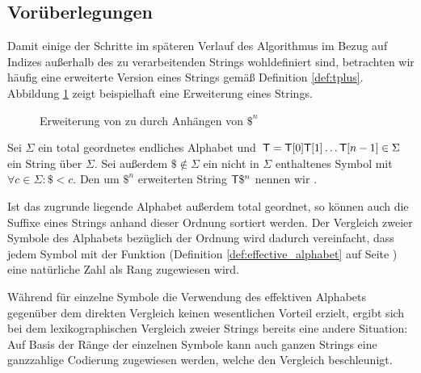 \subsection{Vorüberlegungen}
\label{bpr:vorueberlegungen}

Damit einige der Schritte im späteren Verlauf des Algorithmus im Bezug auf Indizes außerhalb des zu verarbeitenden Strings wohldefiniert sind, betrachten wir häufig eine erweiterte Version eines Strings gemäß Definition \ref{def:tplus}. Abbildung \ref{fig:tplus} zeigt beispielhaft eine Erweiterung eines Strings.

\begin{figure}[ht]
	\caption{Erweiterung von  zu  durch Anhängen von \(\$^n\)}
	\label{fig:tplus}
\end{figure}

\begin{definition}[\inputtextplus]
	\label{def:tplus}
    Sei \(\Sigma\) ein total geordnetes endliches Alphabet und \(\inputtext = \inputtext[0] \inputtext[1] \ldots \inputtext[n-1] \in \Sigma\) ein String über \(\Sigma\). Sei außerdem \(\$ \notin \Sigma\) ein nicht in \(\Sigma\) enthaltenes Symbol mit \(\forall c \in \Sigma : \$ < c\). Den um \(\$^n\) erweiterten String \(\inputtext\$^n\) nennen wir .
\end{definition}

Ist das zugrunde liegende Alphabet außerdem total geordnet, so können auch die Suffixe eines Strings anhand dieser Ordnung sortiert werden.
Der Vergleich zweier Symbole des Alphabets bezüglich der Ordnung wird dadurch vereinfacht, dass jedem Symbol mit der Funktion \effective (Definition \ref{def:effective_alphabet} auf Seite \pageref{def:effective_alphabet}) eine natürliche Zahl als Rang zugewiesen wird.

Während für einzelne Symbole die Verwendung des effektiven Alphabets gegenüber dem direkten Vergleich keinen wesentlichen Vorteil erzielt, ergibt sich bei dem lexikographischen Vergleich zweier Strings bereits eine andere Situation: Auf Basis der Ränge der einzelnen Symbole kann auch ganzen Strings eine ganzzahlige Codierung zugewiesen werden, welche den Vergleich beschleunigt.

